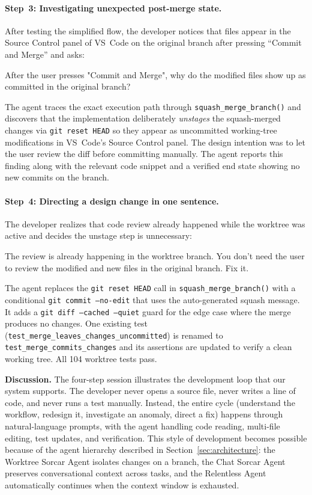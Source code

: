 \documentclass{article}
\begin{document}
\paragraph{Step~3: Investigating unexpected post-merge state.} After testing the simplified flow, the developer notices that files appear in the Source Control panel of VS~Code on the original branch after pressing ``Commit and Merge'' and asks:

\begin{prompt}
After the user presses "Commit and Merge", why do the modified files show up as 
committed in the original branch?
\end{prompt}

\noindent The agent traces the exact execution path through \texttt{squash\_merge\_branch()} and discovers that the implementation deliberately \emph{unstages} the squash-merged changes via \texttt{git reset HEAD} so they appear as uncommitted working-tree modifications in VS~Code's Source Control panel.  The design intention was to let the user review the diff before committing manually.  The agent reports this finding along with the relevant code snippet and a verified end state showing no new commits on the branch.

\paragraph{Step~4: Directing a design change in one sentence.} The developer realizes that code review already happened while the worktree was active and decides the unstage step is unnecessary:

\begin{prompt}
The review is already happening in the worktree branch. You don't need the user 
to review the modified and new files in the original branch. Fix it.
\end{prompt}

\noindent The agent replaces the \texttt{git reset HEAD} call in \texttt{squash\_merge\_branch()} with a conditional \texttt{git commit --no-edit} that uses the auto-generated squash message.  It adds a \texttt{git diff --cached --quiet} guard for the edge case where the merge produces no changes.  One existing test (\texttt{test\_merge\_leaves\_changes\_uncommitted}) is renamed to \texttt{test\_merge\_commits\_changes} and its assertions are updated to verify a clean working tree.  All 104 worktree tests pass.

\medskip
\noindent\textbf{Discussion.} The four-step session illustrates the development loop that our system supports.  The developer never opens a source file, never writes a line of code, and never runs a test manually.  Instead, the entire cycle (understand the workflow, redesign it, investigate an anomaly, direct a fix) happens through natural-language prompts, with the agent handling code reading, multi-file editing, test updates, and verification.  This style of development becomes possible because of the agent hierarchy described in Section~\ref{sec:architecture}: the Worktree Sorcar Agent isolates changes on a branch, the Chat Sorcar Agent preserves conversational context across tasks, and the Relentless Agent automatically continues when the context window is exhausted.
\end{document}
